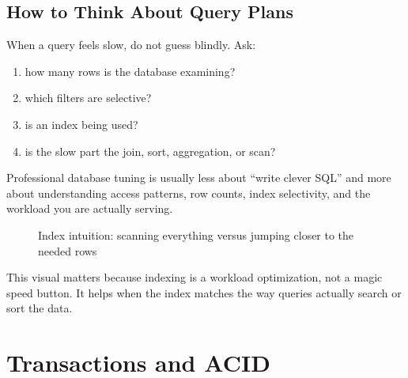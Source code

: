 \documentclass[12pt, a4paper, oneside]{book}
\begin{document}
\subsection{How to Think About Query Plans}

When a query feels slow, do not guess blindly. Ask:
\begin{enumerate}[leftmargin=2em]
    \item how many rows is the database examining?
    \item which filters are selective?
    \item is an index being used?
    \item is the slow part the join, sort, aggregation, or scan?
\end{enumerate}

\begin{notebox}
Professional database tuning is usually less about ``write clever SQL'' and more about understanding access patterns, row counts, index selectivity, and the workload you are actually serving.
\end{notebox}

\begin{figure}[H]
\centering
{}
\caption{Index intuition: scanning everything versus jumping closer to the needed rows}
\label{fig:index-intuition}
\end{figure}

This visual matters because indexing is a workload optimization, not a magic speed button. It helps when the index matches the way queries actually search or sort the data.

\section{Transactions and ACID}
\end{document}
